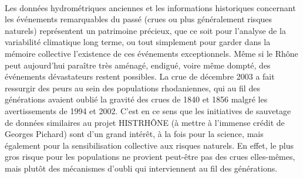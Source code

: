 	\paragraph{} Les données hydrométriques anciennes et les informations historiques concernant les événements remarquables du passé (crues ou plus généralement risques naturels) représentent un patrimoine précieux, que ce soit pour l'analyse de la variabilité climatique long terme, ou tout simplement pour garder dans la mémoire collective l'existence de ces événements exceptionnels. Même si le Rhône peut aujourd'hui paraître très aménagé, endigué, voire même dompté, des événements dévastateurs restent possibles. La crue de décembre 2003 a fait ressurgir des peurs au sein des populations rhodaniennes, qui au fil des générations avaient oublié la gravité des crues de 1840 et 1856 malgré les avertissements de 1994 et 2002. C'est en ce sens que les initiatives de sauvetage de données similaires au projet HISTRHÔNE (à mettre à l'immense crédit de Georges Pichard) sont d'un grand intérêt, à la fois pour la science, mais également pour la sensibilisation collective aux risques naturels. En effet, le plus gros risque pour les populations ne provient peut-être pas des crues elles-mêmes, mais plutôt des mécanismes d'oubli qui interviennent au fil des générations.
	
	
